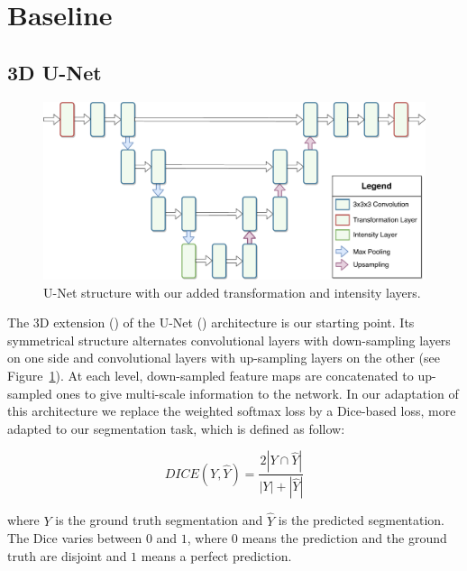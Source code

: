 \section{Baseline}
\label{sec:kidney_baseline}

\subsection{3D U-Net}
\label{ssec:unet}

\begin{figure}[htb]
    \centering
	\includegraphics[width=\textwidth]{img_transfer/UNet}
    \caption{U-Net structure with our added transformation and intensity layers.}
    \label{fig:unet}
\end{figure}

The 3D extension (\textcite{cicek2016MICCAI}) of the U-Net (\textcite{ronneberger2015MICCAI}) architecture is our starting point. Its symmetrical structure alternates convolutional layers with down-sampling layers on one side and convolutional layers with up-sampling layers on the other (see Figure~\ref{fig:unet}). At each level, down-sampled feature maps are concatenated to up-sampled ones to give multi-scale information to the network. In our adaptation of this architecture we replace the weighted softmax loss by a Dice-based loss, more adapted to our segmentation task, which is defined as follow:

\begin{equation}
    DICE \left( Y, \hat{Y} \right) = \frac{2 |Y \cap \hat{Y}|}{|Y| + |\hat{Y}|}
\end{equation}

where $Y$ is the ground truth segmentation and $\hat{Y}$ is the predicted segmentation. The Dice varies between $0$ and $1$, where $0$ means the prediction and the ground truth are disjoint and $1$ means a perfect prediction.


